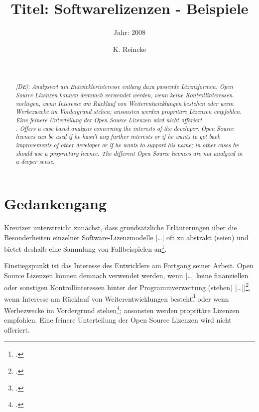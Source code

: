\documentclass[DIV=calc,BCOR=5mm,11pt,headings=small,oneside,abstract=true, toc=bib]{scrartcl}
\begin{document}

\titlehead{Literaturexzerpt}
\subject{Autor(en): Kreutzer}
\title{Titel: Softwarelizenzen - Beispiele}
\subtitle{Jahr: 2008 }
\author{K. Reincke}
\maketitle

\begin{abstract}
\noindent
\cite[(in:)][]{DjoGehGraKreSpi2008a} \\
\noindent
\cite[(ist:)][176 - 179]{Kreutzer2008c} \\
\noindent \itshape
[DE]:  Analysiert am Entwicklerinteresse entlang dazu passende Lizenzformen:
Open Source Lizenzen können demnach verwendet werden, wenn keine
Kontrollinteressen vorliegen, wenn Interesse am Rücklauf von
Weiterentwicklungen bestehen oder wenn Werbezwecke im Vordergrund stehen;
ansonsten werden propritäre Lizenzen empfohlen. Eine feinere Unterteilung der
Open Source Lizenzen wird nicht offeriert. \\
\noindent
[EN]: Offers a case based analysis concerning the interests of the developer:
Open Source licences can be used if he hasn't any further interests or if he
wants to get back improvements of other developer or if he wants to support his
name; in other cases he should use a proprietary licence. The different Open
Source licences are not analyzed in a deeper sense.
\end{abstract}
\footnotesize
\normalsize

\section{Gedankengang}

Kreutzer unterstreicht zunächst, dass \glqq{} grundsätzliche Erläuterungen über
die Besonderheiten einzelner Software-Lizenzmodelle [\ldots] oft zu abstrakt
(seien) \grqq{} und bietet deshalb eine \glqq{}Sammlung von
Fallbeispielen\grqq{} an\footcite[vgl.][176ff]{Kreutzer2008c}.

Einstiegspunkt ist das Interesse des Entwicklers am Fortgang seiner Arbeit. Open
Source Lizenzen können demnach verwendet werden, wenn \glqq{}[\ldots] keine
finanziellen oder sonstigen Kontrollinteressen hinter der Programmverwertung
(stehen) [\ldots]]\grqq{}\footcite[vgl.][176]{Kreutzer2008c}, wenn Interesse am
Rücklauf von Weiterentwicklungen besteht\footcite[vgl.][177]{Kreutzer2008c} oder
wenn Werbezwecke im Vordergrund stehen\footcite[vgl.][178]{Kreutzer2008c};
ansonsten werden propritäre Lizenzen empfohlen. Eine feinere Unterteilung der
Open Source Lizenzen wird nicht offeriert.

\small

\end{document}
